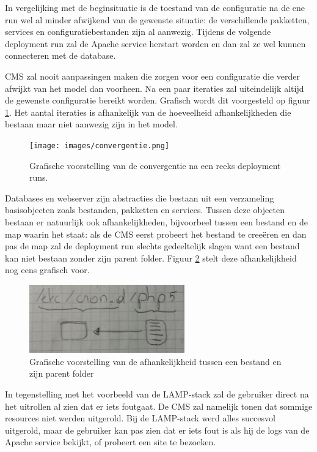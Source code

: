 In vergelijking met de beginsituatie is de toestand van de configuratie na de ene run wel al minder afwijkend van de gewenste situatie:
de verschillende pakketten, services en configuratiebestanden zijn al aanwezig.
Tijdens de volgende deployment run zal de Apache service herstart worden en dan zal ze wel kunnen connecteren met de database.

CMS zal nooit aanpassingen maken die zorgen voor een configuratie die verder afwijkt van het model dan voorheen.
Na een paar iteraties zal uiteindelijk altijd de gewenste configuratie bereikt worden. 
Grafisch wordt dit voorgesteld op figuur \ref{fig:convergentie}.
Het aantal iteraties is afhankelijk van de hoeveelheid afhankelijkheden die bestaan maar niet aanwezig zijn in het model.

\begin{figure}
    \begin{center}
    \texttt{[image: images/convergentie.png]}
    \caption{Grafische voorstelling van de convergentie na een reeks deployment runs.}
    \label{fig:convergentie}
    \end{center}
\end{figure}

Databases en webserver zijn abstracties die bestaan uit een verzameling basisobjecten zoals bestanden, pakketten en services.
Tussen deze objecten bestaan er natuurlijk ook afhankelijkheden, bijvoorbeel tussen een bestand en de map waarin het staat:
als de CMS eerst probeert het bestand te cree\"eren en dan pas de map zal de deployment run slechts gedeeltelijk slagen want een bestand kan niet bestaan zonder zijn parent folder.
Figuur \ref{fig:file_dir_dep} stelt deze afhankelijkheid nog eens grafisch voor.
\begin{figure}
    \begin{center}
    \includegraphics[width=0.6\textwidth]{images/file_dir_dep.png}
    \caption{Grafische voorstelling van de afhankelijkheid tussen een bestand en zijn parent folder}
    \label{fig:file_dir_dep}
    \end{center}
\end{figure}
In tegenstelling met het voorbeeld van de LAMP-stack zal de gebruiker direct na het uitrollen al zien dat er iets foutgaat.
De CMS zal namelijk tonen dat sommige resources niet werden uitgerold.
Bij de LAMP-stack werd alles succesvol uitgerold, maar de gebruiker kan pas zien dat er iets fout is als hij de logs van de Apache service bekijkt, of probeert een site te bezoeken.

